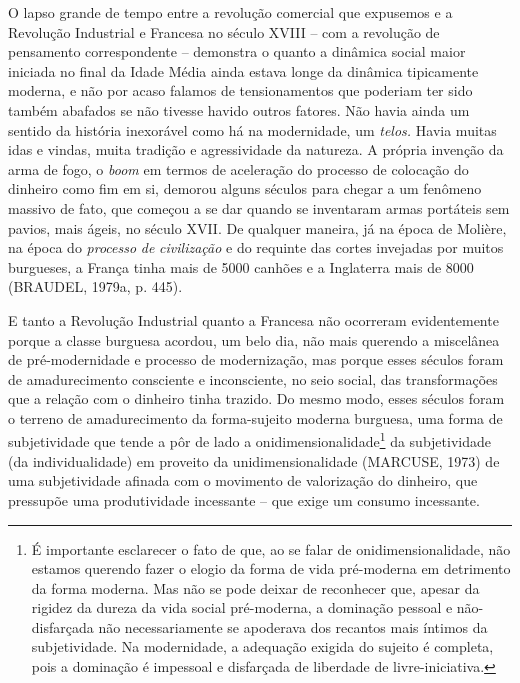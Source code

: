 O lapso grande de tempo entre a revolução comercial que expusemos e a
Revolução Industrial e Francesa no século XVIII -- com a revolução de
pensamento correspondente -- demonstra o quanto a dinâmica social maior
iniciada no final da Idade Média ainda estava longe da dinâmica
tipicamente moderna, e não por acaso falamos de tensionamentos que
poderiam ter sido também abafados se não tivesse havido outros fatores.
Não havia ainda um sentido da história inexorável como há na
modernidade, um \emph{telos.} Havia muitas idas e vindas, muita tradição
e agressividade da natureza. A própria invenção da arma de fogo, o
\emph{boom} em termos de aceleração do processo de colocação do dinheiro
como fim em si, demorou alguns séculos para chegar a um fenômeno massivo
de fato, que começou a se dar quando se inventaram armas portáteis sem
pavios, mais ágeis, no século XVII. De qualquer maneira, já na época de
Molière, na época do \emph{processo} \emph{de} \emph{civilização} e do
requinte das cortes invejadas por muitos burgueses, a França tinha mais
de 5000 canhões e a Inglaterra mais de 8000 (BRAUDEL, 1979a, p. 445).

E tanto a Revolução Industrial quanto a Francesa não ocorreram
evidentemente porque a classe burguesa acordou, um belo dia, não mais
querendo a miscelânea de pré-modernidade e processo de modernização, mas
porque esses séculos foram de amadurecimento consciente e inconsciente,
no seio social, das transformações que a relação com o dinheiro tinha
trazido. Do mesmo modo, esses séculos foram o terreno de amadurecimento
da forma-sujeito moderna burguesa, uma forma de subjetividade que tende
a pôr de lado a onidimensionalidade\footnote{É importante esclarecer o
  fato de que, ao se falar de onidimensionalidade, não estamos querendo
  fazer o elogio da forma de vida pré-moderna em detrimento da forma
  moderna. Mas não se pode deixar de reconhecer que, apesar da rigidez
  da dureza da vida social pré-moderna, a dominação pessoal e
  não-disfarçada não necessariamente se apoderava dos recantos mais
  íntimos da subjetividade. Na modernidade, a adequação exigida do
  sujeito é completa, pois a dominação é impessoal e disfarçada de
  liberdade de livre-iniciativa.} da subjetividade (da individualidade)
em proveito da unidimensionalidade (MARCUSE, 1973) de uma subjetividade
afinada com o movimento de valorização do dinheiro, que pressupõe uma
produtividade incessante -- que exige um consumo incessante.

